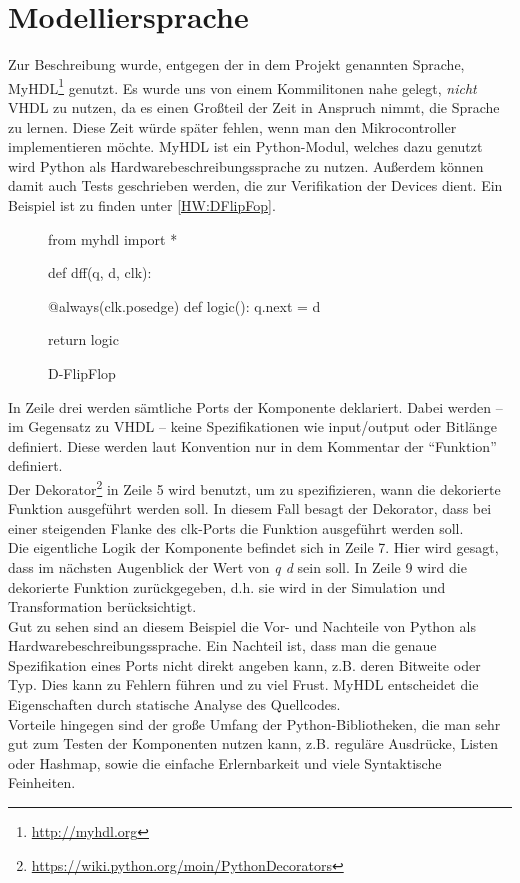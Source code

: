\section{Modelliersprache}
Zur Beschreibung wurde, entgegen der in dem Projekt genannten Sprache, MyHDL\footnote{\url{http://myhdl.org}} genutzt. Es wurde uns von einem Kommilitonen nahe gelegt, \textit{nicht} VHDL zu nutzen, da es einen Großteil der Zeit in Anspruch nimmt, die Sprache zu lernen. Diese Zeit würde später fehlen, wenn man den Mikrocontroller implementieren möchte.
MyHDL ist ein Python-Modul, welches dazu genutzt wird Python als Hardwarebeschreibungssprache zu nutzen. Außerdem können damit auch Tests geschrieben werden, die zur Verifikation der Devices dient.
Ein Beispiel ist zu finden unter \autoref{HW:DFlipFop}.

\begin{figure}[h]
\small
\begin{pythoncode}
from myhdl import *
 
def dff(q, d, clk):
 
    @always(clk.posedge)
    def logic():
        q.next = d
 
    return logic
\end{pythoncode}
\caption{\label{HW:DFlipFop}D-FlipFlop}
\end{figure}

In Zeile drei werden sämtliche Ports der Komponente deklariert. Dabei werden -- im Gegensatz zu VHDL -- keine Spezifikationen wie input/output oder Bitlänge definiert. Diese werden laut Konvention nur in dem Kommentar der ``Funktion'' definiert.\\
Der Dekorator\footnote{\url{https://wiki.python.org/moin/PythonDecorators}} in Zeile 5 wird benutzt, um zu spezifizieren, wann die dekorierte Funktion ausgeführt werden soll. In diesem Fall besagt der Dekorator, dass bei einer steigenden Flanke des clk-Ports die Funktion ausgeführt werden soll.\\
Die eigentliche Logik der Komponente befindet sich in Zeile 7. Hier wird gesagt, dass im nächsten Augenblick der Wert von \textit{q d} sein soll.
In Zeile 9 wird die dekorierte Funktion zurückgegeben, d.h. sie wird in der Simulation und Transformation berücksichtigt.\\
Gut zu sehen sind an diesem Beispiel die Vor- und Nachteile von Python als Hardwarebeschreibungssprache. Ein Nachteil ist, dass man die genaue Spezifikation eines Ports nicht direkt angeben kann, z.B. deren Bitweite oder Typ. Dies kann zu Fehlern führen und zu viel Frust. MyHDL entscheidet die Eigenschaften durch statische Analyse des Quellcodes.\\
Vorteile hingegen sind der große Umfang der Python-Bibliotheken, die man sehr gut zum Testen der Komponenten nutzen kann, z.B. reguläre Ausdrücke, Listen oder Hashmap, sowie die einfache Erlernbarkeit und viele Syntaktische Feinheiten.\\

